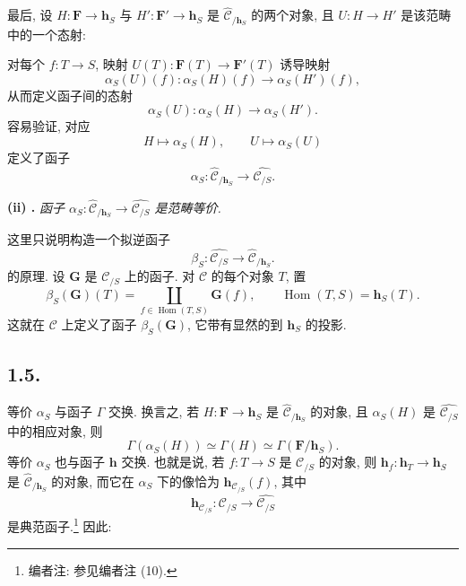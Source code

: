 最后, 设 \(H:\mathbf F\to\mathbf h_S\) 与
\(H':\mathbf F'\to\mathbf h_S\) 是
\(\widehat{\mathscr C}_{/\mathbf h_S}\) 的两个对象,
且 \(U:H\to H'\) 是该范畴中的一个态射:

\begin{center}
  
\end{center}

对每个 \(f:T\to S\), 映射 \(U(T):\mathbf F(T)\to\mathbf F'(T)\) 诱导映射
\[
  \alpha_S(U)(f):\alpha_S(H)(f)
    \longrightarrow\alpha_S(H')(f),
\]
从而定义函子间的态射
\[
  \alpha_S(U):\alpha_S(H)\longrightarrow\alpha_S(H').
\]
容易验证, 对应
\[
  H\longmapsto\alpha_S(H),
  \qquad
  U\longmapsto\alpha_S(U)
\]
定义了函子
\[
  \alpha_S:\widehat{\mathscr C}_{/\mathbf h_S}
    \longrightarrow\widehat{\mathscr C_{/S}}.
\]

\medskip
{}
\noindent\textbf{(ii) .}
\textit{函子
\(\alpha_S:\widehat{\mathscr C}_{/\mathbf h_S}
\to\widehat{\mathscr C_{/S}}\) 是范畴等价.}

这里只说明构造一个拟逆函子
\[
  \beta_S:\widehat{\mathscr C_{/S}}
    \longrightarrow\widehat{\mathscr C}_{/\mathbf h_S}.
\]
的原理.
设 \(\mathbf G\) 是 \(\mathscr C_{/S}\) 上的函子.
对 \(\mathscr C\) 的每个对象 \(T\), 置
\[
  \beta_S(\mathbf G)(T)
    =\coprod_{f\in\operatorname{Hom}(T,S)}\mathbf G(f),
  \qquad \operatorname{Hom}(T,S)=\mathbf h_S(T).
\]
这就在 \(\mathscr C\) 上定义了函子 \(\beta_S(\mathbf G)\),
它带有显然的到 \(\mathbf h_S\) 的投影.

\subsection*{1.5.}

等价 \(\alpha_S\) 与函子 \(\Gamma\) 交换.
换言之, 若 \(H:\mathbf F\to\mathbf h_S\) 是
\(\widehat{\mathscr C}_{/\mathbf h_S}\) 的对象,
且 \(\alpha_S(H)\) 是 \(\widehat{\mathscr C_{/S}}\) 中的相应对象, 则
\[
  \Gamma(\alpha_S(H))
    \simeq\Gamma(H)
    \simeq\Gamma(\mathbf F/\mathbf h_S).
\]
等价 \(\alpha_S\) 也与函子 \(\mathbf h\) 交换.
也就是说, 若 \(f:T\to S\) 是 \(\mathscr C_{/S}\) 的对象,
则 \(\mathbf h_f:\mathbf h_T\to\mathbf h_S\) 是
\(\widehat{\mathscr C}_{/\mathbf h_S}\) 的对象,
而它在 \(\alpha_S\) 下的像恰为 \(\mathbf h_{\mathscr C_{/S}}(f)\), 其中
\[
  \mathbf h_{\mathscr C_{/S}}:
    \mathscr C_{/S}\longrightarrow\widehat{\mathscr C_{/S}}
\]
是典范函子.\footnote{编者注: 参见编者注 (10).}
因此:

